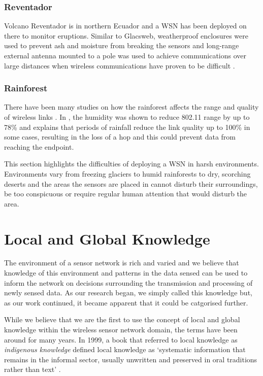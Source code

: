	\subsubsection{Reventador}
	Volcano Reventador is in northern Ecuador and a WSN has been deployed on there to monitor eruptions. Similar to Glacsweb, weatherproof enclosures were used to prevent ash and moisture from breaking the sensors and long-range external antenna mounted to a pole was used to achieve communications over large distances when wireless communications have proven to be difficult \cite{Werner-Allen2006}.
	\subsubsection{Rainforest}
	There have been many studies on how the rainforest affects the range and quality of wireless links \cite{Figueiredo2009, Wark2008, Rahman2008}. In \cite{Figueiredo2009}, the humidity was shown to reduce 802.11 range by up to 78\% and \cite{Wark2008} explains that periods of rainfall reduce the link quality up to 100\% in some cases, resulting in the loss of a hop and this could prevent data from reaching the endpoint.


This section highlights the difficulties of deploying a WSN in harsh environments. Environments vary from freezing glaciers to humid rainforests to dry, scorching deserts and the areas the sensors are placed in cannot disturb their surroundings, be too conspicuous or require regular human attention that would disturb the area. 

\section{Local and Global Knowledge} \label{bg:lgk}
	The environment of a sensor network is rich and varied and we believe that knowledge of this environment and patterns in the data sensed can be used to inform the network on decisions surrounding the transmission and processing of newly sensed data. As our research began, we simply called this knowledge but, as our work continued, it became apparent that it could be catgorised further.

While we believe that we are the first to use the concept of local and global knowledge within the wireless sensor network domain, the terms have been around for many years. In 1999, a book that referred to local knowledge as \textit{indigenous knowledge} defined local knowledge as ‘systematic information that remains in the informal sector, usually unwritten and preserved in oral traditions rather than text’ \cite{LadislausM.Semali}. 

